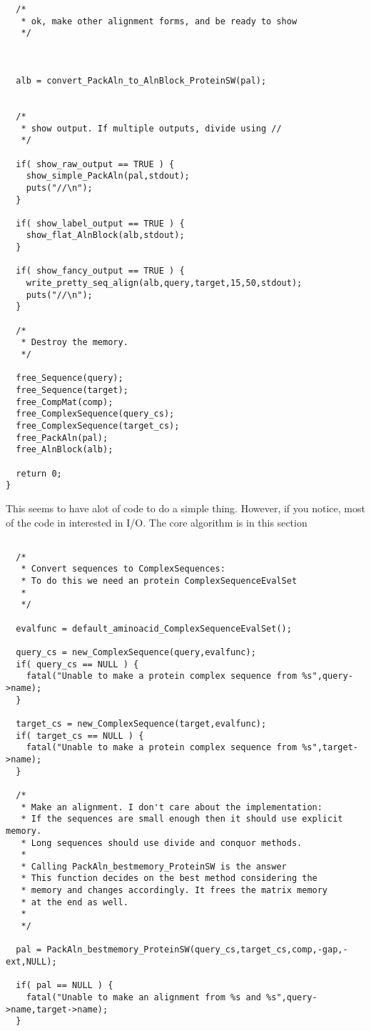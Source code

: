 \begin{verbatim}
  /*
   * ok, make other alignment forms, and be ready to show
   */



  alb = convert_PackAln_to_AlnBlock_ProteinSW(pal);


  /*
   * show output. If multiple outputs, divide using //
   */

  if( show_raw_output == TRUE ) {
    show_simple_PackAln(pal,stdout);
    puts("//\n");
  }

  if( show_label_output == TRUE ) {
    show_flat_AlnBlock(alb,stdout);
  }

  if( show_fancy_output == TRUE ) {
    write_pretty_seq_align(alb,query,target,15,50,stdout);
    puts("//\n");
  }

  /*
   * Destroy the memory.
   */  

  free_Sequence(query);
  free_Sequence(target);
  free_CompMat(comp);
  free_ComplexSequence(query_cs);
  free_ComplexSequence(target_cs);
  free_PackAln(pal);
  free_AlnBlock(alb);

  return 0;
}
\end{verbatim}


This seems to have alot of code to do a simple thing. However, if you notice,
most of the code in interested in I/O. The core algorithm is in this section

\begin{verbatim}
  
  /*
   * Convert sequences to ComplexSequences: 
   * To do this we need an protein ComplexSequenceEvalSet
   *
   */
  
  evalfunc = default_aminoacid_ComplexSequenceEvalSet();
  
  query_cs = new_ComplexSequence(query,evalfunc);
  if( query_cs == NULL ) {
    fatal("Unable to make a protein complex sequence from %s",query->name);
  }
  
  target_cs = new_ComplexSequence(target,evalfunc);
  if( target_cs == NULL ) {
    fatal("Unable to make a protein complex sequence from %s",target->name);
  }
  
  /*
   * Make an alignment. I don't care about the implementation:
   * If the sequences are small enough then it should use explicit memory.
   * Long sequences should use divide and conquor methods.
   *
   * Calling PackAln_bestmemory_ProteinSW is the answer
   * This function decides on the best method considering the
   * memory and changes accordingly. It frees the matrix memory 
   * at the end as well.
   *
   */     

  pal = PackAln_bestmemory_ProteinSW(query_cs,target_cs,comp,-gap,-ext,NULL);

  if( pal == NULL ) {
    fatal("Unable to make an alignment from %s and %s",query->name,target->name);
  }

\end{verbatim}


